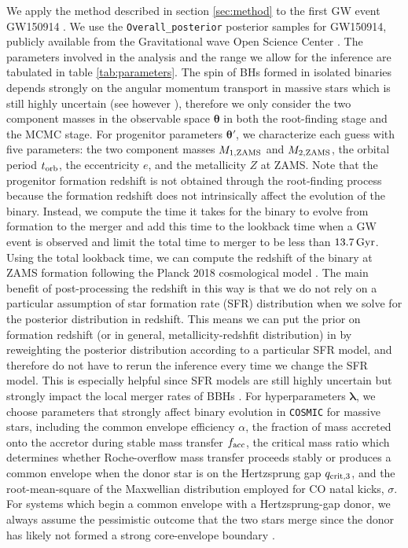 \documentclass[twocolumn]{aastex631}
\begin{document}
We apply the method described in section \ref{sec:method} to the first GW event GW150914 \citep{GW150914}.
We use the \texttt{Overall\_posterior} posterior samples for GW150914,
publicly available from the Gravitational wave Open Science Center \citep{LIGOScientific:2019lzm}. 
The parameters involved in the analysis and the range we allow for the inference are tabulated in table \ref{tab:parameters}.
The spin of BHs formed in isolated binaries depends strongly on the angular
momentum transport in massive stars which is still highly uncertain (see however \citet{Fuller2019, Bavera2020}),
therefore we only consider the two component masses in the observable space $\bm{\theta}$ in both the
root-finding stage and the MCMC stage. For progenitor parameters $\bm{\theta'}$, we characterize each guess with
five parameters: the two component masses $M_{\rm 1,ZAMS}$ and $M_{\rm 2,ZAMS}$, the orbital period $t_{\rm orb}$,
the eccentricity $e$, and the metallicity $Z$ at ZAMS. Note that the progenitor formation redshift is not
obtained through the root-finding process because the formation redshift does not intrinsically affect
the evolution of the binary. Instead, we compute the time it takes for the binary to evolve from
formation to the merger and add this time to the lookback time when a GW event is observed and limit the total
time to merger to be less than $13.7\,\rm{Gyr}$.
Using the total lookback time, we can compute the redshift of the binary at ZAMS formation following the
Planck 2018 cosmological model \citep{Planck2018}.
The main benefit of post-processing the redshift in this way is that we do not rely on a particular assumption
of star formation rate (SFR) distribution when we solve for the posterior distribution in redshift.
This means we can put the prior on formation redshift (or in general, metallicity-redshfit distribution) in
by reweighting the posterior distribution according to a particular SFR model,
and therefore do not have to rerun the inference every time we change the SFR model. This is especially helpful
since SFR models are still highly uncertain but strongly impact the local merger rates of BBHs \citep[e.g. ][]{Broekgaarden2021}.
For hyperparameters $\bm{\lambda}$, we choose parameters that strongly affect
binary evolution in \texttt{COSMIC} for massive stars, including the common envelope
efficiency $\alpha$, the fraction of mass accreted onto the accretor during stable mass transfer $f_{\rm acc}$,
the critical mass ratio which determines whether Roche-overflow mass transfer
proceeds stably or produces a common envelope when the donor star is on the Hertzsprung gap
$q_{\rm crit,3}$, and the root-mean-square of the Maxwellian distribution
employed for CO natal kicks, $\sigma$. For systems which begin a common envelope 
with a Hertzsprung-gap donor, we always assume the pessimistic outcome that the two 
stars merge since the donor has likely not formed a strong core-envelope boundary 
\citep{Ivanova2004, Belczynski2008}.
\end{document}
